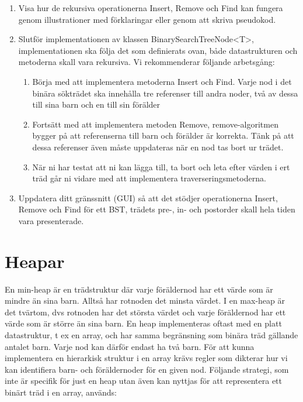 \documentclass{article}
\begin{document}
\begin{enumerate}
\item Visa hur de rekursiva operationerna Insert, Remove och Find kan fungera genom illustrationer med förklaringar eller genom att skriva pseudokod.
\item Slutför implementationen av klassen BinarySearchTreeNode<T>, implementationen
ska följa det som definierats ovan, både datastrukturen och metoderna skall vara
rekursiva. Vi rekommenderar följande arbetsgång:
\begin{enumerate}
\item Börja med att implementera metoderna Insert och Find. Varje nod i det binära
sökträdet ska innehålla tre referenser till andra noder, två av dessa till sina barn
och en till sin förälder
\item Fortsätt med att implementera metoden Remove, remove-algoritmen bygger på
att referenserna till barn och förälder är korrekta. Tänk på att dessa referenser
även måste uppdateras när en nod tas bort ur trädet.
\item När ni har testat att ni kan lägga till, ta bort och leta efter värden i ert träd går ni vidare med att implementera traverseringsmetoderna.
\end{enumerate}
\item Uppdatera ditt gränssnitt (GUI) så att det stödjer operationerna Insert, Remove och Find för ett BST, trädets pre-, in- och postorder skall hela tiden vara presenterade.
\end{enumerate}



  \section*{Heapar
  }
  
  En min-heap är en trädstruktur där varje föräldernod har ett värde som är mindre än sina barn. Alltså har rotnoden det minsta värdet. I en max-heap är det tvärtom, dvs rotnoden har det största värdet och varje föräldernod har ett värde som är större än sina barn. En heap implementeras oftast med en platt datastruktur, t ex en array, och har samma begränsning som binära träd gällande antalet barn. Varje nod kan därför endast ha två barn.
  För att kunna implementera en hierarkisk struktur i en array krävs regler som dikterar hur vi kan identifiera barn- och föräldernoder för en given nod. Följande strategi, som inte är specifik för just en heap utan även kan nyttjas för att representera ett binärt träd i en array, används:
  
\end{document}
